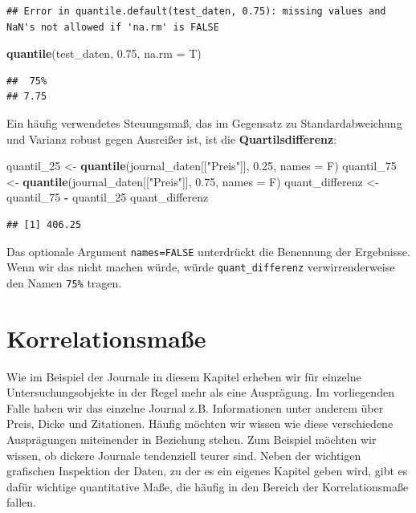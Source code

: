 \documentclass[]{book}
\newenvironment{Shaded}{\begin{snugshade}}{\end{snugshade}}
\newcommand{\KeywordTok}[1]{\textcolor[rgb]{0.13,0.29,0.53}{\textbf{#1}}}
\newcommand{\DataTypeTok}[1]{\textcolor[rgb]{0.13,0.29,0.53}{#1}}
\newcommand{\DecValTok}[1]{\textcolor[rgb]{0.00,0.00,0.81}{#1}}
\newcommand{\FloatTok}[1]{\textcolor[rgb]{0.00,0.00,0.81}{#1}}
\newcommand{\StringTok}[1]{\textcolor[rgb]{0.31,0.60,0.02}{#1}}
\newcommand{\OperatorTok}[1]{\textcolor[rgb]{0.81,0.36,0.00}{\textbf{#1}}}
\newcommand{\NormalTok}[1]{#1}
\begin{document}
\begin{verbatim}
## Error in quantile.default(test_daten, 0.75): missing values and NaN's not allowed if 'na.rm' is FALSE
\end{verbatim}

\begin{Shaded}
\begin{Highlighting}[]
\KeywordTok{quantile}\NormalTok{(test_daten, }\FloatTok{0.75}\NormalTok{, }\DataTypeTok{na.rm =}\NormalTok{ T)}
\end{Highlighting}
\end{Shaded}

\begin{verbatim}
##  75% 
## 7.75
\end{verbatim}

Ein häufig verwendetes Steuungsmaß, das im Gegensatz zu
Standardabweichung und Varianz robust gegen Ausreißer ist, ist die
\textbf{Quartilsdifferenz}:

\begin{Shaded}
\begin{Highlighting}[]
\NormalTok{quantil_}\DecValTok{25}\NormalTok{ <-}\StringTok{ }\KeywordTok{quantile}\NormalTok{(journal_daten[[}\StringTok{"Preis"}\NormalTok{]], }\FloatTok{0.25}\NormalTok{, }\DataTypeTok{names =}\NormalTok{ F)}
\NormalTok{quantil_}\DecValTok{75}\NormalTok{ <-}\StringTok{ }\KeywordTok{quantile}\NormalTok{(journal_daten[[}\StringTok{"Preis"}\NormalTok{]], }\FloatTok{0.75}\NormalTok{, }\DataTypeTok{names =}\NormalTok{ F)}
\NormalTok{quant_differenz <-}\StringTok{ }\NormalTok{quantil_}\DecValTok{75} \OperatorTok{-}\StringTok{ }\NormalTok{quantil_}\DecValTok{25}
\NormalTok{quant_differenz}
\end{Highlighting}
\end{Shaded}

\begin{verbatim}
## [1] 406.25
\end{verbatim}

Das optionale Argument \texttt{names=FALSE} unterdrückt die Benennung
der Ergebnisse. Wenn wir das nicht machen würde, würde
\texttt{quant\_differenz} verwirrenderweise den Namen \texttt{75\%}
tragen.

\section{Korrelationsmaße}\label{korrelationsmae}

Wie im Beispiel der Journale in diesem Kapitel erheben wir für einzelne
Untersuchungsobjekte in der Regel mehr als eine Ausprägung. Im
vorliegenden Falle haben wir das einzelne Journal z.B. Informationen
unter anderem über Preis, Dicke und Zitationen. Häufig möchten wir
wissen wie diese verschiedene Ausprägungen miteinender in Beziehung
stehen. Zum Beispiel möchten wir wissen, ob dickere Journale tendenziell
teurer sind. Neben der wichtigen grafischen Inspektion der Daten, zu der
es ein eigenes Kapitel geben wird, gibt es dafür wichtige quantitative
Maße, die häufig in den Bereich der Korrelationsmaße fallen.
\end{document}
